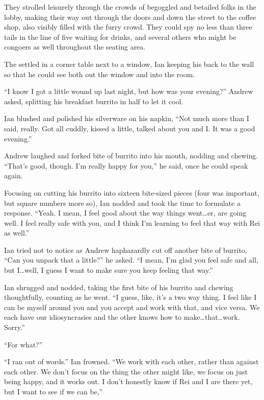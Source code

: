 They strolled leisurely through the crowds of begoggled and betailed folks in the lobby, making their way out through the doors and down the street to the coffee shop, also visibly filled with the furry crowd. They could spy no less than three tails in the line of five waiting for drinks, and several others who might be congoers as well throughout the seating area.

The settled in a corner table next to a window, Ian keeping his back to the wall so that he could see both out the window and into the room.

``I know I got a little wound up last night, but how was your evening?'' Andrew asked, splitting his breakfast burrito in half to let it cool.

Ian blushed and polished his silverware on his napkin, ``Not much more than I said, really. Got all cuddly, kissed a little, talked about you and I. It was a good evening.''

Andrew laughed and forked bite of burrito into his mouth, nodding and chewing. ``That's good, though. I'm really happy for you,'' he said, once he could speak again.

Focusing on cutting his burrito into sixteen bite-sized pieces (four was important, but square numbers more so), Ian nodded and took the time to formulate a response. ``Yeah. I mean, I feel good about the way things went\ldots{}er, are going well. I feel really safe with you, and I think I'm learning to feel that way with Rei as well.''

Ian tried not to notice as Andrew haphazardly cut off another bite of burrito, ``Can you unpack that a little?'' he asked. ``I mean, I'm glad you feel safe and all, but I\ldots{}well, I guess I want to make sure you keep feeling that way.''

Ian shrugged and nodded, taking the first bite of his burrito and chewing thoughtfully, counting as he went. ``I guess, like, it's a two way thing. I feel like I can be myself around you and you accept and work with that, and vice versa. We each have our idiosyncrasies and the other knows how to make\ldots{}that\ldots{}work. Sorry.''

``For what?''

``I ran out of words.'' Ian frowned. ``We work with each other, rather than against each other. We don't focus on the thing the other might like, we focus on just being happy, and it works out. I don't honestly know if Rei and I are there yet, but I want to see if we can be,''

